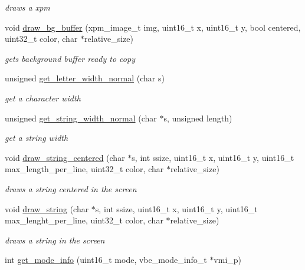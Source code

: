 \begin{DoxyCompactItemize}
\begin{DoxyCompactList}\small\item\em draws a xpm \end{DoxyCompactList}\item 
void \hyperlink{group__Video_gad6fecc9854349e79299c1a719665b0cb}{draw\+\_\+bg\+\_\+buffer} (xpm\+\_\+image\+\_\+t img, uint16\+\_\+t x, uint16\+\_\+t y, bool centered, uint32\+\_\+t color, char $\ast$relative\+\_\+size)
\begin{DoxyCompactList}\small\item\em gets background buffer ready to copy \end{DoxyCompactList}\item 
unsigned \hyperlink{group__Video_ga5e63b50c933f1307aca72b0cafc77a14}{get\+\_\+letter\+\_\+width\+\_\+normal} (char s)
\begin{DoxyCompactList}\small\item\em get a character width \end{DoxyCompactList}\item 
unsigned \hyperlink{group__Video_gaefb95d930fabc3645326297ed5d37b63}{get\+\_\+string\+\_\+width\+\_\+normal} (char $\ast$s, unsigned length)
\begin{DoxyCompactList}\small\item\em get a string width \end{DoxyCompactList}\item 
void \hyperlink{group__Video_ga1df81e7b585ed7302d9cb1fe263e72e2}{draw\+\_\+string\+\_\+centered} (char $\ast$s, int ssize, uint16\+\_\+t x, uint16\+\_\+t y, uint16\+\_\+t max\+\_\+length\+\_\+per\+\_\+line, uint32\+\_\+t color, char $\ast$relative\+\_\+size)
\begin{DoxyCompactList}\small\item\em draws a string centered in the screen \end{DoxyCompactList}\item 
void \hyperlink{group__Video_ga65f3bcb27a5b294654783b067086a175}{draw\+\_\+string} (char $\ast$s, int ssize, uint16\+\_\+t x, uint16\+\_\+t y, uint16\+\_\+t max\+\_\+lenght\+\_\+per\+\_\+line, uint32\+\_\+t color, char $\ast$relative\+\_\+size)
\begin{DoxyCompactList}\small\item\em draws a string in the screen \end{DoxyCompactList}\item 
int \hyperlink{group__Video_gaa3e656b61ae08209e349f5b3e7b1a76f}{get\+\_\+mode\+\_\+info} (uint16\+\_\+t mode, vbe\+\_\+mode\+\_\+info\+\_\+t $\ast$vmi\+\_\+p)

\end{DoxyCompactItemize}

